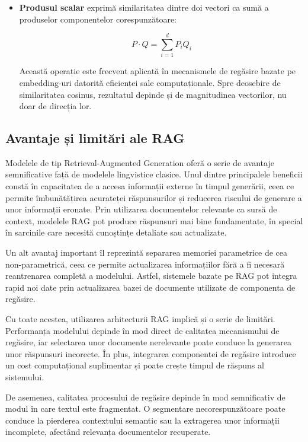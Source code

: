 \documentclass[12pt, a4paper, oneside, romanian]{teza-upb}
\begin{document}
\begin{itemize}
\item\textbf{Produsul scalar} exprimă similaritatea dintre doi vectori ca sumă a produselor componentelor corespunzătoare:

\begin{equation}
P \cdot Q = \sum_{i=1}^{d} P_i Q_i
\end{equation}

Această operație este frecvent aplicată în mecanismele de regăsire bazate pe embedding-uri datorită eficienței sale computaționale. Spre deosebire de similaritatea cosinus, rezultatul depinde și de magnitudinea vectorilor, nu doar de direcția lor. \cite{levy2024similarity}
\end{itemize}
    \subsection{Avantaje și limitări ale RAG}
  

Modelele de tip Retrieval-Augmented Generation oferă o serie de avantaje semnificative față de modelele lingvistice clasice. Unul dintre principalele beneficii constă în capacitatea de a accesa informații externe în timpul generării, ceea ce permite îmbunătățirea acurateței răspunsurilor și reducerea riscului de generare a unor informații eronate. Prin utilizarea documentelor relevante ca sursă de context, modelele RAG pot produce răspunsuri mai bine fundamentate, în special în sarcinile care necesită cunoștințe detaliate sau actualizate.

Un alt avantaj important îl reprezintă separarea memoriei parametrice de cea non-parametrică, ceea ce permite actualizarea informațiilor fără a fi necesară reantrenarea completă a modelului. Astfel, sistemele bazate pe RAG pot integra rapid noi date prin actualizarea bazei de documente utilizate de componenta de regăsire.\cite{lewis2020retrieval}

Cu toate acestea, utilizarea arhitecturii RAG implică și o serie de limitări. Performanța modelului depinde în mod direct de calitatea mecanismului de regăsire, iar selectarea unor documente nerelevante poate conduce la generarea unor răspunsuri incorecte. În plus, integrarea componentei de regăsire introduce un cost computațional suplimentar și poate crește timpul de răspuns al sistemului. 


De asemenea, calitatea procesului de regăsire depinde în mod semnificativ de modul în care textul este fragmentat. O segmentare necorespunzătoare poate conduce la pierderea contextului semantic sau la extragerea unor informații incomplete, afectând relevanța documentelor recuperate. 
\end{document}
